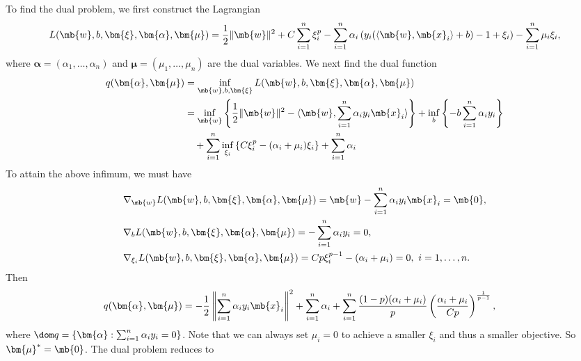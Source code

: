 \begin{exercise}
    \begin{solution}
        To find the dual problem, we first construct the Lagrangian
        \begin{align*}
            L(\mb{w},b,\bm{\xi},\bm{\alpha},\bm{\mu}) = \frac{1}{2}\|\mb{w}\|^2 + C\sum_{i=1}^n\xi_i^p - \sum_{i=1}^n\alpha_i\left(y_i(\langle\mb{w},\mb{x}_i\rangle+b)-1+\xi_i\right) - \sum_{i=1}^n\mu_i\xi_i,
        \end{align*}
        where $\bm{\alpha} = (\alpha_1, \ldots, \alpha_n)$ and $\bm{\mu} = (\mu_1, \ldots, \mu_n)$ are the dual variables. We next find the dual function
        \begin{align*}
            q(\bm{\alpha}, \bm{\mu}) & = \inf_{\mb{w},b,\bm{\xi}} L(\mb{w},b,\bm{\xi},\bm{\alpha},\bm{\mu})                                                                                                      \\
                                     & = \inf_{\mb{w}} \left\{\frac{1}{2}\|\mb{w}\|^2 - \langle \mb{w}, \sum_{i=1}^n \alpha_i y_i\mb{x}_i \rangle \right\} + \inf_b \left\{-b \sum_{i=1}^n \alpha_i y_i \right\} \\
                                     & \quad + \sum_{i=1}^n \inf_{\xi_i} \left\{ C \xi_i^p - (\alpha_i + \mu_i) \xi_i \right\} + \sum_{i=1}^n \alpha_i
        \end{align*}
        To attain the above infimum, we must have
        \begin{align*}
             & \nabla_{\mb{w}} L(\mb{w},b,\bm{\xi},\bm{\alpha},\bm{\mu}) = \mb{w} - \sum_{i=1}^n \alpha_i y_i \mb{x}_i = \mb{0},    \\
             & \nabla_b L(\mb{w},b,\bm{\xi},\bm{\alpha},\bm{\mu}) = -\sum_{i=1}^n \alpha_i y_i = 0,                                 \\
             & \nabla_{\xi_i} L(\mb{w},b,\bm{\xi},\bm{\alpha},\bm{\mu}) = C p \xi_i^{p-1} - (\alpha_i + \mu_i) = 0, \ i=1,\ldots,n.
        \end{align*}
        Then
        \begin{align*}
            q(\bm{\alpha}, \bm{\mu}) & = -\frac{1}{2} \left\|\sum_{i=1}^n \alpha_i y_i\mb{x}_i \right\|^2 + \sum_{i=1}^n \alpha_i + \sum_{i=1}^n \frac{(1-p)(\alpha_i + \mu_i)}{p} \left(\frac{\alpha_i + \mu_i}{Cp}\right)^{\frac{1}{p-1}},
        \end{align*}
        where $\dom q = \left\{\bm{\alpha}: \sum_{i=1}^n \alpha_i y_i = 0 \right\}$. Note that we can always set $\mu_i = 0$ to achieve a smaller $\xi_i$ and thus a smaller objective. So $\bm{\mu}^* = \mb{0}$. The dual problem reduces to

\end{solution}
\end{exercise}

